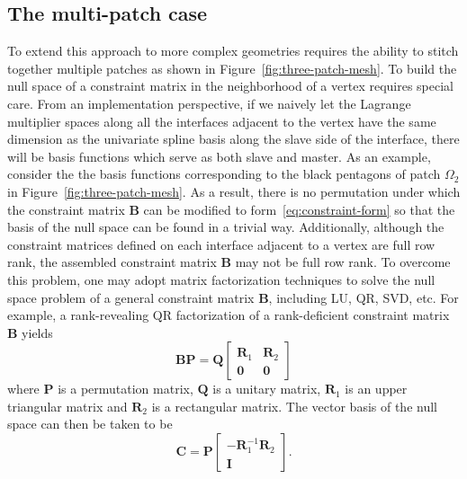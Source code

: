 \subsection{The multi-patch case}

To extend this approach to more complex geometries requires the ability to stitch together multiple patches as shown in Figure~\ref{fig:three-patch-mesh}. To build the null space of a constraint matrix in the neighborhood of a vertex requires special care. From an implementation perspective, if we naively let the Lagrange multiplier spaces along all the interfaces adjacent to the vertex have the same dimension as the univariate spline basis along the slave side of the interface, there will be basis functions which serve as both slave and master. As an example, consider the the basis functions corresponding to the black pentagons of patch $\Omega_2$ in Figure~\ref{fig:three-patch-mesh}. As a result, there is no permutation under which the constraint matrix $\mathbf{B}$ can be modified to form~\eqref{eq:constraint-form} so that the basis of the null space can be found in a trivial way. Additionally, although the constraint matrices defined on each interface adjacent to a vertex are full row rank, the assembled constraint matrix $\mathbf{B}$ may not be full row rank. To overcome this problem, one may adopt matrix factorization techniques to solve the null space problem of a general constraint matrix $\mathbf{B}$, including LU, QR, SVD, etc. For example, a rank-revealing QR factorization of a rank-deficient constraint matrix $\mathbf{B}$ yields
\begin{equation}
  \mathbf{B}\mathbf{P}=
  \mathbf{Q}
  \begin{bmatrix}
    \mathbf{R}_1 & \mathbf{R}_2 \\
    \mathbf{0}   & \mathbf{0}
  \end{bmatrix}
\end{equation}
where $\mathbf{P}$ is a permutation matrix, $\mathbf{Q}$ is a unitary matrix, $\mathbf{R}_1$ is an upper triangular matrix and $\mathbf{R}_2$ is a rectangular matrix. The vector basis of the null space can then be taken to be
\begin{equation}
  \mathbf{C}=
  \mathbf{P}
  \begin{bmatrix}
    -\mathbf{R}_1^{-1}\mathbf{R}_2 \\
    \mathbf{I}
  \end{bmatrix}.\label{eq:direct_kernel}
\end{equation}
